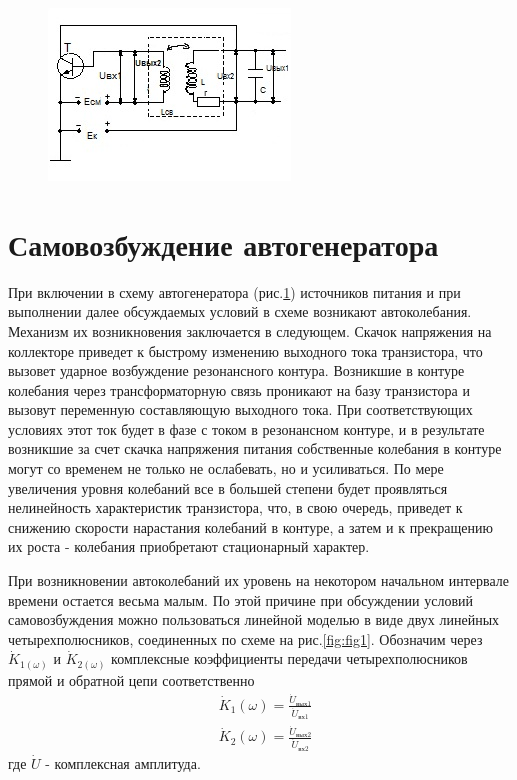 \begin{figure}[h]
	\centering
	\includegraphics[width=\linewidth]{circuit/2}
	\caption{}
	\label{fig:fig2}
\end{figure}

\section{Самовозбуждение автогенератора}
При включении в схему автогенератора (рис.\ref{fig:fig2}) источников питания и при выполнении далее обсуждаемых условий в схеме возникают автоколебания. Механизм их возникновения заключается в следующем. Скачок напряжения на коллекторе приведет к быстрому изменению выходного тока транзистора, что вызовет ударное возбуждение резонансного контура. Возникшие в контуре колебания через трансформаторную связь проникают на базу транзистора и вызовут переменную составляющую выходного тока. При соответствующих условиях этот ток будет в фазе с током в резонансном контуре, и в результате возникшие за счет скачка напряжения питания собственные колебания в контуре могут со временем не только не ослабевать, но и усиливаться. По мере увеличения уровня колебаний все в большей степени будет проявляться нелинейность характеристик транзистора, что, в свою очередь, приведет к снижению скорости нарастания колебаний в контуре, а затем и к прекращению их роста - колебания приобретают стационарный характер.

При возникновении автоколебаний их уровень на некотором начальном интервале времени остается весьма малым. По этой причине при обсуждении условий самовозбуждения можно пользоваться линейной моделью в виде двух линейных четырехполюсников, соединенных по схеме на рис.\ref{fig:fig1}. Обозначим через $\dot{K}_{1(\omega)}$ и $\dot{K}_{2(\omega)}$ комплексные коэффициенты передачи четырехполюсников прямой и обратной цепи соответственно
\begin{equation*}
\begin{aligned}
&\dot{K}_1(\omega)=\frac{\dot{U}_{\text{вых}1}}{\dot{U}_{\text{вх}1}} \\
&\dot{K}_2(\omega)=\frac{\dot{U}_{\text{вых}2}}{\dot{U}_{\text{вх}2}} 
\end{aligned}
\end{equation*}
где $\dot{U}$ - комплексная амплитуда.

